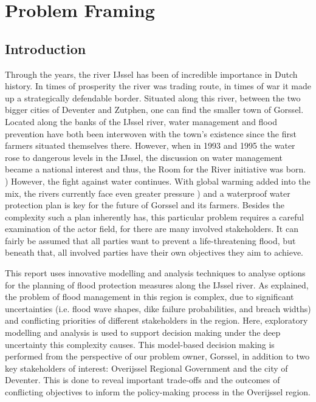 \section{Problem Framing}
\label{s:prob_frame}
\subsection{Introduction}
Through the years, the river IJssel has been of incredible importance in Dutch history. In times of prosperity the river was trading route, in times of war it made up a strategically defendable border. Situated along this river, between the two bigger cities of Deventer and Zutphen, one can find the smaller town of Gorssel. Located along the banks of the IJssel river, water management and flood prevention have both been interwoven with the town's existence since the first farmers situated themselves there. However, when in 1993 and 1995 the water rose to dangerous levels in the IJssel, the discussion on water management became a national interest and thus, the Room for the River initiative was born. \parencite{rijke_room_2012}) However, the fight against water continues. With global warming added into the mix, the rivers currently face even greater pressure \parencite{takken_wegen_2009}) and a waterproof water protection plan is key for the future of Gorssel and its farmers. Besides the complexity such a plan inherently has, this particular problem requires a careful examination of the actor field, for there are many involved stakeholders. It can fairly be assumed that all parties want to prevent a life-threatening flood, but beneath that, all involved parties have their own objectives they aim to achieve.  

This report uses innovative modelling and analysis techniques to analyse options for the planning of flood protection measures along the IJssel river. As explained, the problem of flood management in this region is complex, due to significant uncertainties (i.e. flood wave shapes, dike failure probabilities, and breach widths) and conflicting priorities of different stakeholders in the region. Here, exploratory modelling and analysis is used to support decision making under the deep uncertainty this complexity causes. This model-based decision making is performed from the perspective of our problem owner, Gorssel, in addition to two key stakeholders of interest: Overijssel Regional Government and the city of Deventer. This is done to reveal important trade-offs and the outcomes of conflicting objectives to inform the policy-making process in the Overijssel region.

